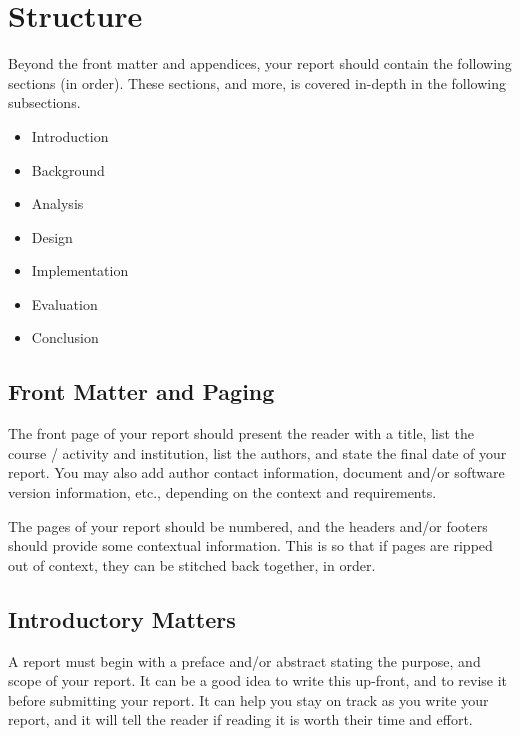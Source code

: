 \section{Structure}

\label{sec:structure}

Beyond the front matter and appendices, your report should contain the
following sections (in order). These sections, and more, is covered in-depth in
the following subsections.

\begin{itemize}

\item Introduction

\item Background

\item Analysis

\item Design

\item Implementation

\item Evaluation

\item Conclusion

\end{itemize}

\subsection{Front Matter and Paging}

The front page of your report should present the reader with a title, list the
course / activity and institution, list the authors, and state the final date
of your report. You may also add author contact information, document and/or
software version information, etc., depending on the context and requirements.

The pages of your report should be numbered, and the headers and/or footers
should provide some contextual information. This is so that if pages are ripped
out of context, they can be stitched back together, in order.

\subsection{Introductory Matters}

A report must begin with a preface and/or abstract stating the purpose, and
scope of your report. It can be a good idea to write this up-front, and to
revise it before submitting your report. It can help you stay on track as you
write your report, and it will tell the reader if reading it is worth their
time and effort.

